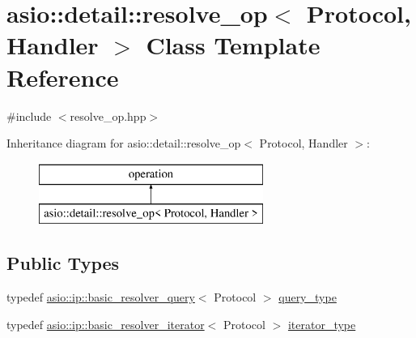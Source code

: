 \hypertarget{classasio_1_1detail_1_1resolve__op}{}\section{asio\+:\+:detail\+:\+:resolve\+\_\+op$<$ Protocol, Handler $>$ Class Template Reference}
\label{classasio_1_1detail_1_1resolve__op}


{\ttfamily \#include $<$resolve\+\_\+op.\+hpp$>$}

Inheritance diagram for asio\+:\+:detail\+:\+:resolve\+\_\+op$<$ Protocol, Handler $>$\+:\begin{figure}[H]
\begin{center}
\leavevmode
\includegraphics[height=2.000000cm]{classasio_1_1detail_1_1resolve__op}
\end{center}
\end{figure}
\subsection*{Public Types}
\begin{DoxyCompactItemize}
\item 
typedef \hyperlink{classasio_1_1ip_1_1basic__resolver__query}{asio\+::ip\+::basic\+\_\+resolver\+\_\+query}$<$ Protocol $>$ \hyperlink{classasio_1_1detail_1_1resolve__op_a53f417f33afa9bc3982e7d951593ca65}{query\+\_\+type}
\item 
typedef \hyperlink{classasio_1_1ip_1_1basic__resolver__iterator}{asio\+::ip\+::basic\+\_\+resolver\+\_\+iterator}$<$ Protocol $>$ \hyperlink{classasio_1_1detail_1_1resolve__op_a8fb28ab524444ef950accb0cdc144579}{iterator\+\_\+type}
\end{DoxyCompactItemize}
